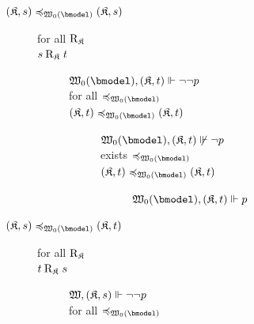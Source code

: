 \begin{example}
\begin{figure}
\begin{center}
{{\begin{minipage}[t]{.55\textwidth}
\begin{description}
                        \item[${\pair \kmodel s} \Fof{\wmofbm0} {\pair \kmodel s}$] \hfil
                        \begin{description}
                                \item[for all $\mathbin{\mathrm{R}_{\mathfrak{K}_{}}}$]
                                \item[$s \mathbin{\mathrm{R}_{\mathfrak{K}_{}}} t$] \hfil
                                \begin{description}
                                \item[$\xforces {\wmofbm0} {\pair \kmodel t} {\lnot\lnot p}$]
                                \item[for all $\Fof{\wmofbm0}$]
                                \item[${\pair \kmodel t} \Fof{\wmofbm0} {\pair \kmodel t}$]\hfil
                                \begin{description}
                                        \item[$\nxforces {\wmofbm0} {\pair \kmodel t} {\lnot p}$]
                                        \item[exists $\Fof{\wmofbm0}$]
                                        \item[${\pair \kmodel t} \Fof{\wmofbm0} {\pair \kmodel t}$]\hfil
                                        \item[\quad] $\xforces {\wmofbm0} {\pair \kmodel t} p$
                                \end{description}
                                \end{description}
                        \end{description}
                        
                        \item[${\pair \kmodel s} \Fof{\wmofbm0} {\pair \kmodel t}$] \hfil
                        \begin{description}
                                \item[for all $\mathbin{\mathrm{R}_{\mathfrak{K}_{}}}$]
                                \item[$t \mathbin{\mathrm{R}_{\mathfrak{K}_{}}} s$]\hfil
                                \begin{description}
                                \item[${\mathfrak{W},(\mathfrak{K},s)}\Vdash{\lnot}\lnot p$]
                                \item[for all $\Fof{\wmofbm0}$]
                                

\end{description}
\end{description}
\end{description}
\end{minipage}}}
\end{center}
\end{figure}
\end{example}

